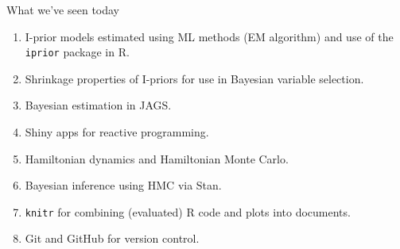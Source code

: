 \documentclass[]{beamer}\usepackage[]{graphicx}\usepackage[]{color}
\begin{document}
\begin{frame}{What we've seen today}
	\begin{enumerate}[1]
		\item I-prior models estimated using ML methods (EM algorithm) and use of the \texttt{iprior} package in R.
		\item Shrinkage properties of I-priors for use in Bayesian variable selection.
		\item Bayesian estimation in JAGS.
		\item Shiny apps for reactive programming.
		\item Hamiltonian dynamics and Hamiltonian Monte Carlo.
		\item Bayesian inference using HMC via Stan.
		\item \texttt{knitr} for combining (evaluated) R code and plots into documents.
		\item Git and GitHub for version control.
	\end{enumerate}
\end{frame}
\end{document}
